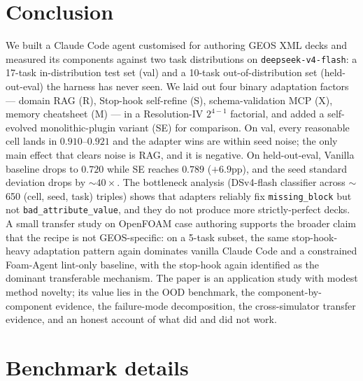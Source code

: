 \documentclass{article}
\begin{document}
\section{Conclusion}
\label{sec:conclusion}

We built a Claude Code agent customised for authoring GEOS XML decks and measured its components against two task distributions on \texttt{deepseek-v4-flash}: a 17-task in-distribution test set (val) and a 10-task out-of-distribution set (held-out-eval) the harness has never seen. We laid out four binary adaptation factors --- domain RAG (R), Stop-hook self-refine (S), schema-validation MCP (X), memory cheatsheet (M) --- in a Resolution-IV $2^{4-1}$ factorial, and added a self-evolved monolithic-plugin variant (SE) for comparison. On val, every reasonable cell lands in $0.910$--$0.921$ and the adapter wins are within seed noise; the only main effect that clears noise is RAG, and it is negative. On held-out-eval, Vanilla baseline drops to $0.720$ while SE reaches $0.789$ ($+6.9$pp), and the seed standard deviation drops by ${\sim}40\times$. The bottleneck analysis (DSv4-flash classifier across $\sim$650 (cell, seed, task) triples) shows that adapters reliably fix \texttt{missing\_block} but not \texttt{bad\_attribute\_value}, and they do not produce more strictly-perfect decks. A small transfer study on OpenFOAM case authoring supports the broader claim that the recipe is not GEOS-specific: on a 5-task subset, the same stop-hook-heavy adaptation pattern again dominates vanilla Claude Code and a constrained Foam-Agent lint-only baseline, with the stop-hook again identified as the dominant transferable mechanism. The paper is an application study with modest method novelty; its value lies in the OOD benchmark, the component-by-component evidence, the failure-mode decomposition, the cross-simulator transfer evidence, and an honest account of what did and did not work.



\medskip

{
\small
}





\appendix

\section{Benchmark details}
\label{app:bench}
\end{document}

